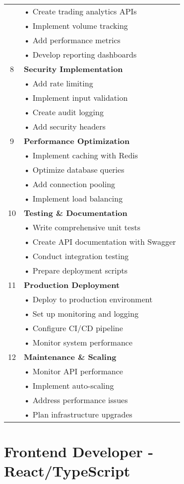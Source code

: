 \documentclass{article}
\begin{document}
\begin{longtable}{|c|p{}|}
& • Create trading analytics APIs\\
& • Implement volume tracking\\
& • Add performance metrics\\
& • Develop reporting dashboards\\
\hline
8 & \textbf{Security Implementation}\\
& • Add rate limiting\\
& • Implement input validation\\
& • Create audit logging\\
& • Add security headers\\
\hline
9 & \textbf{Performance Optimization}\\
& • Implement caching with Redis\\
& • Optimize database queries\\
& • Add connection pooling\\
& • Implement load balancing\\
\hline
10 & \textbf{Testing \& Documentation}\\
& • Write comprehensive unit tests\\
& • Create API documentation with Swagger\\
& • Conduct integration testing\\
& • Prepare deployment scripts\\
\hline
11 & \textbf{Production Deployment}\\
& • Deploy to production environment\\
& • Set up monitoring and logging\\
& • Configure CI/CD pipeline\\
& • Monitor system performance\\
\hline
12 & \textbf{Maintenance \& Scaling}\\
& • Monitor API performance\\
& • Implement auto-scaling\\
& • Address performance issues\\
& • Plan infrastructure upgrades\\
\hline
\end{longtable}

\section*{Frontend Developer - React/TypeScript}
\end{document}
